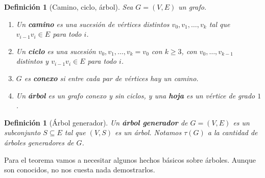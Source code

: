 \documentclass[12pt,a4paper]{article}
\theoremstyle{profesional}
\theoremstyle{definicion-style}
\newtheorem{definicion}[teorema]{Definición}
\theoremstyle{observacion-style}
\begin{document}
\begin{definicion}[Camino, ciclo, árbol]
    Sea \( G = (V, E) \) un grafo.
    \begin{enumerate}[label=\arabic*.]
        \item Un \textbf{camino} es una sucesión de vértices distintos \( v_0, v_1, \ldots, v_k \) tal que \( v_{i-1}v_i \in E \) para todo \( i \).
        \item Un \textbf{ciclo} es una sucesión \( v_0, v_1, \ldots, v_k = v_0 \) con \( k \geq 3 \), con \( v_0, \ldots, v_{k-1} \) distintos y \( v_{i-1}v_i \in E \) para todo \( i \).
        \item \( G \) es \textbf{conexo} si entre cada par de vértices hay un camino.
        \item Un \textbf{árbol} es un grafo conexo y sin ciclos, y una \textbf{hoja} es un vértice de grado \( 1 \).
    \end{enumerate}
\end{definicion}

\begin{definicion}[Árbol generador]
    Un \textbf{árbol generador} de \( G = (V, E) \) es un subconjunto \( S \subseteq E \) tal que \( (V, S) \) es un árbol. Notamos \( \tau(G) \) a la cantidad de árboles generadores de \( G \).
\end{definicion}

Para el teorema vamos a necesitar algunos hechos básicos sobre árboles. Aunque son conocidos, no nos cuesta nada demostrarlos.
\end{document}
